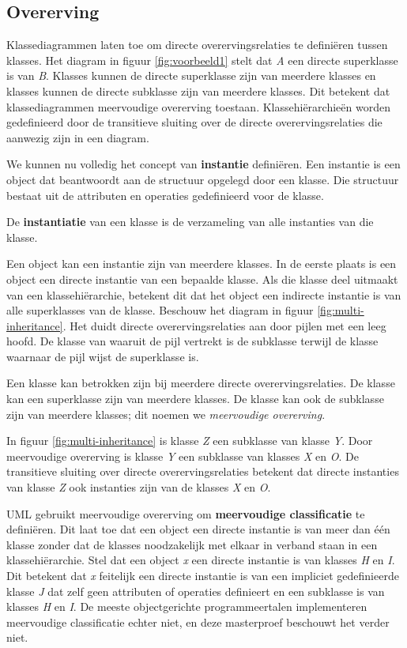 \subsection{Overerving}\label{sec:semantics-gen}

Klassediagrammen laten toe om directe overervingsrelaties te defini\"eren tussen klasses. Het diagram in figuur \ref{fig:voorbeeld1} stelt dat \textit{A} een directe superklasse is van \textit{B}. Klasses kunnen de directe superklasse zijn van meerdere klasses en klasses kunnen de directe subklasse zijn van meerdere klasses. Dit betekent dat klassediagrammen meervoudige overerving toestaan. Klassehi\"erarchie\"en worden gedefinieerd door de transitieve sluiting over de directe overervingsrelaties die aanwezig zijn in een diagram.

We kunnen nu volledig het concept van \textbf{instantie} defini\"eren. Een instantie is een object dat beantwoordt aan de structuur opgelegd door een klasse. Die structuur bestaat uit de attributen en operaties gedefinieerd voor de klasse.

De \textbf{instantiatie} van een klasse is de verzameling van alle instanties van die klasse.

Een object kan een instantie zijn van meerdere klasses. In de eerste plaats is een object een directe instantie van een bepaalde klasse. Als die klasse deel uitmaakt van een klassehi\"erarchie, betekent dit dat het object een indirecte instantie is van alle superklasses van de klasse. Beschouw het diagram in figuur \ref{fig:multi-inheritance}. Het duidt directe overervingsrelaties aan door pijlen met een leeg hoofd. De klasse van waaruit de pijl vertrekt is de subklasse terwijl de klasse waarnaar de pijl wijst de superklasse is.

Een klasse kan betrokken zijn bij meerdere directe overervingsrelaties. De klasse kan een superklasse zijn van meerdere klasses. De klasse kan ook de subklasse zijn van meerdere klasses; dit noemen we \textit{meervoudige overerving}.

In figuur \ref{fig:multi-inheritance} is klasse \textit{Z} een subklasse van klasse \textit{Y}. Door meervoudige overerving is klasse \textit{Y} een subklasse van klasses \textit{X} en \textit{O}. De transitieve sluiting over directe overervingsrelaties betekent dat directe instanties van klasse \textit{Z} ook instanties zijn van de klasses \textit{X} en \textit{O}.

UML gebruikt meervoudige overerving om \textbf{meervoudige classificatie}\cite{RumbaughJames2005Tuml} te defini\"eren. Dit laat toe dat een object een directe instantie is van meer dan \'e\'en klasse zonder dat de klasses noodzakelijk met elkaar in verband staan in een klassehi\"erarchie. Stel dat een object \textit{x} een directe instantie is van klasses \textit{H} en \textit{I}. Dit betekent dat \textit{x} feitelijk een directe instantie is van een impliciet gedefinieerde klasse \textit{J} dat zelf geen attributen of operaties definieert en een subklasse is van klasses \textit{H} en \textit{I}. De meeste objectgerichte programmeertalen implementeren meervoudige classificatie echter niet, en deze masterproef beschouwt het verder niet.

